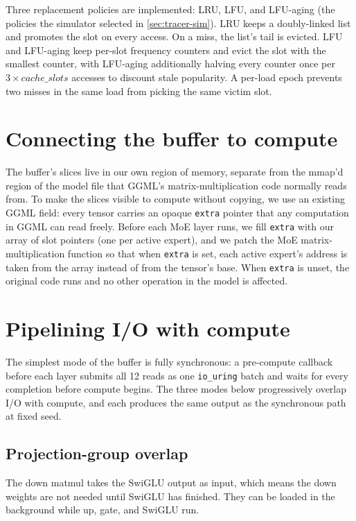 Three replacement policies are implemented: LRU, LFU, and LFU-aging (the policies the simulator selected in \autoref{sec:tracer-sim}).
LRU keeps a doubly-linked list and promotes the slot on every access.
On a miss, the list's tail is evicted.
LFU and LFU-aging keep per-slot frequency counters and evict the slot with the smallest counter, with LFU-aging additionally halving every counter once per $3 \times \mathit{cache\_slots}$ accesses to discount stale popularity.
A per-load epoch prevents two misses in the same load from picking the same victim slot.


\section{Connecting the buffer to compute}\label{sec:buffer-integration}

The buffer's slices live in our own region of memory, separate from the mmap'd region of the model file that GGML's matrix-multiplication code normally reads from.
To make the slices visible to compute without copying, we use an existing GGML field: every tensor carries an opaque \texttt{extra} pointer that any computation in GGML can read freely.
Before each MoE layer runs, we fill \texttt{extra} with our array of slot pointers (one per active expert), and we patch the MoE matrix-multiplication function so that when \texttt{extra} is set, each active expert's address is taken from the array instead of from the tensor's base.
When \texttt{extra} is unset, the original code runs and no other operation in the model is affected.


\section{Pipelining I/O with compute}\label{sec:pipelining}

The simplest mode of the buffer is fully synchronous: a pre-compute callback before each layer submits all 12 reads as one \texttt{io\_uring} batch and waits for every completion before compute begins.
The three modes below progressively overlap I/O with compute, and each produces the same output as the synchronous path at fixed seed.


\subsection{Projection-group overlap}\label{sec:pipelining-po}

The down matmul takes the SwiGLU output as input, which means the down weights are not needed until SwiGLU has finished.
They can be loaded in the background while up, gate, and SwiGLU run.


